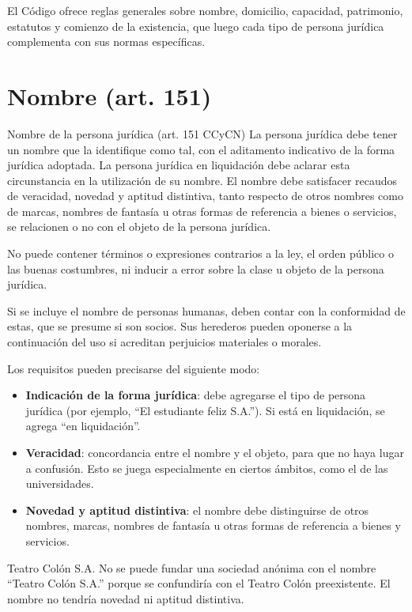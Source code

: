 \documentclass[12pt,oneside]{book}
\begin{document}
El Código ofrece reglas generales sobre nombre, domicilio, capacidad, patrimonio, estatutos y comienzo de la existencia, que luego cada tipo de persona jurídica complementa con sus normas específicas.

\section{Nombre (art. 151)}

\begin{definition}{Nombre de la persona jurídica (art. 151 CCyCN)}
La persona jurídica debe tener un nombre que la identifique como tal, con el aditamento indicativo de la forma jurídica adoptada. La persona jurídica en liquidación debe aclarar esta circunstancia en la utilización de su nombre. El nombre debe satisfacer recaudos de veracidad, novedad y aptitud distintiva, tanto respecto de otros nombres como de marcas, nombres de fantasía u otras formas de referencia a bienes o servicios, se relacionen o no con el objeto de la persona jurídica.

No puede contener términos o expresiones contrarios a la ley, el orden público o las buenas costumbres, ni inducir a error sobre la clase u objeto de la persona jurídica.

Si se incluye el nombre de personas humanas, deben contar con la conformidad de estas, que se presume si son socios. Sus herederos pueden oponerse a la continuación del uso si acreditan perjuicios materiales o morales.
\end{definition}

Los requisitos pueden precisarse del siguiente modo:

\begin{itemize}
    \item \textbf{Indicación de la forma jurídica}: debe agregarse el tipo de persona jurídica (por ejemplo, ``El estudiante feliz S.A.''). Si está en liquidación, se agrega ``en liquidación''.
    \item \textbf{Veracidad}: concordancia entre el nombre y el objeto, para que no haya lugar a confusión. Esto se juega especialmente en ciertos ámbitos, como el de las universidades.
    \item \textbf{Novedad y aptitud distintiva}: el nombre debe distinguirse de otros nombres, marcas, nombres de fantasía u otras formas de referencia a bienes y servicios.
\end{itemize}

\begin{example}{Teatro Colón S.A.}
No se puede fundar una sociedad anónima con el nombre ``Teatro Colón S.A.'' porque se confundiría con el Teatro Colón preexistente. El nombre no tendría novedad ni aptitud distintiva.
\end{example}
\end{document}
